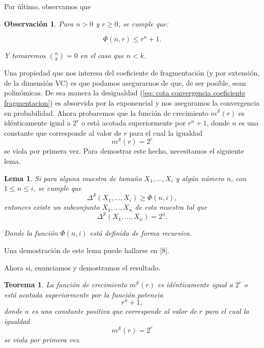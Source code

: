 \documentclass{article}
\newtheorem{thm}{Teorema}[subsection]
\newtheorem{lem}{Lema}[subsection]
\newtheorem{obs}{Observación}[subsection]
\begin{document}
Por último, observamos que

\begin{obs}   
Para \( n > 0 \) y \( r \geq 0 \), se cumple que:

\[
\Phi(n, r) \leq r^n + 1.
\]

Y tomaremos \( \binom{n}{k} = 0 \) en el caso que \( n < k \).\newline
\end{obs}


Una propiedad que nos interesa del coeficiente de fragmentación (y por extensión, de la dimensión VC) es que podamos asegurarnos
de que, de ser posible, sean polinómicas. De esa manera la desigualdad (\ref{eq: cota convergencia coeficiente fragmentacion})
es absorvida por la exponencial y nos aseguramos la convergencia en probabilidad. \newline
Ahora probaremos que la función de crecimiento $m^{\mathcal{S}}(r)$ 
es idénticamente igual a \( 2^r \) o está acotada superiormente por \( r^n + 1 \),  
donde \( n \) es una constante que corresponde al valor de \( r \) para el cual la igualdad  
\[
m^{\mathcal{S}}(r) = 2^r
\]
se viola por primera vez. Para demostrar este hecho, necesitamos el siguiente lema.\newline

\begin{lem}
Si para alguna muestra de tamaño \( X_1, \dots, X_i \) y algún número \( n \), con \( 1 \leq n \leq i \),  
se cumple que  
\[
\Delta^{\mathcal{S}}(X_1, \dots, X_i) \geq \Phi(n, i),
\]  
entonces existe un subconjunto \( X_1, \dots, X_n \) de esta muestra tal que  
\[
\Delta^{\mathcal{S}}(X_1, \dots, X_n) = 2^n.
\]  

Donde la función \( \Phi(n, i) \) está definida de forma recursiva.  
\end{lem}

Una demostración de este lema puede hallarse en [8].\newline

Ahora si, enunciamos y demostramos el resultado.\newline

\begin{thm}
    La función de crecimiento \( m^{\mathcal{S}}(r) \) es idénticamente igual a \( 2^r \) o está acotada superiormente por la función potencia  
    \[
    r^n + 1,
    \]
    donde \( n \) es una constante positiva que corresponde al valor de \( r \) para el cual la igualdad  
    \[
    m^{\mathcal{S}}(r) = 2^r
    \]
    se viola por primera vez.    
\end{thm}
\end{document}

